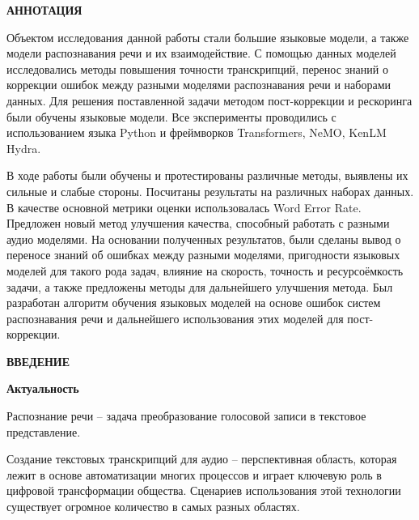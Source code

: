 \newpage
\begin{center}
  \textbf{\large АННОТАЦИЯ}
\end{center}


Объектом исследования данной работы стали большие языковые модели, а также модели распознавания речи и их взаимодействие.
С помощью данных моделей исследовались методы повышения точности транскрипций, перенос знаний о коррекции ошибок между разными моделями распознавания речи и наборами данных.
Для решения поставленной задачи методом пост-коррекции и рескоринга были обучены языковые модели.
Все эксперименты проводились с использованием языка Python и фреймворков Transformers, NeMO, KenLM Hydra.

В ходе работы были обучены и протестированы различные методы, выявлены их сильные и слабые стороны.
Посчитаны результаты на различных наборах данных.
В качестве основной метрики оценки использовалась Word Error Rate.
Предложен новый метод улучшения качества, способный работать с разными аудио моделями.
На основании полученных результатов, были сделаны вывод о переносе знаний об ошибках между разными моделями, пригодности языковых моделей для такого рода задач, влияние на скорость, точность и ресурсоёмкость задачи, а также предложены методы для дальнейшего улучшения метода.
Был разработан алгоритм обучения языковых моделей на основе ошибок систем распознавания речи и дальнейшего использования этих моделей для пост-коррекции.

\onehalfspacing
\setcounter{page}{2}

\newpage
\renewcommand{\contentsname}{\centerline{\large СОДЕРЖАНИЕ}}
\tableofcontents

\newpage
\begin{center}
  \textbf{\large ВВЕДЕНИЕ}
\end{center}


\textbf{Актуальность}

Распознание речи -- задача преобразование голосовой записи в текстовое представление.

Создание текстовых транскрипций для аудио  -- перспективная область, которая лежит в основе автоматизации многих процессов и играет ключевую роль в цифровой трансформации общества.
Сценариев использования этой технологии существует огромное количество в самых разных областях.

